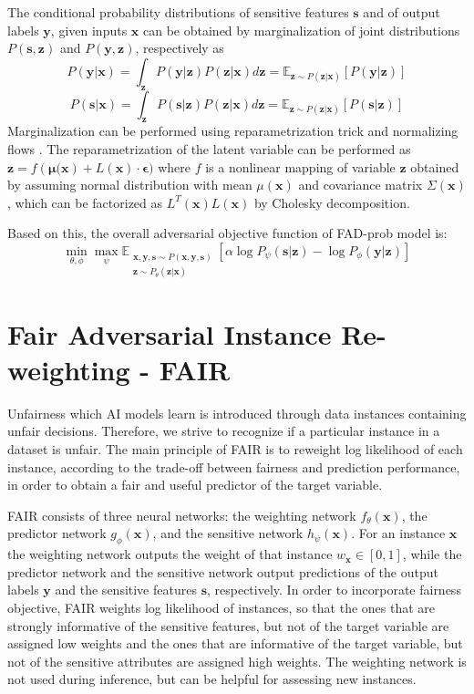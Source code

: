 \documentclass[preprint,12pt]{elsarticle}
\begin{document}
The conditional probability distributions of sensitive features $\mathbf{s}$ and of output labels $\mathbf{y}$,  given inputs $\mathbf{x}$ can be obtained by marginalization of joint distributions $P(\mathbf{s},\mathbf{z})$ and $P(\mathbf{y},\mathbf{z})$, respectively as
$$ P(\mathbf{y}|\mathbf{x}) = \int_\mathbf{z} P(\mathbf{y}|\mathbf{z}) P(\mathbf{z}|\mathbf{x}) d\mathbf{z} = \mathbb{E}_{\mathbf{z} \sim P(\mathbf{z}|\mathbf{x})} [P(\mathbf{y}|\mathbf{z})]$$
$$ P(\mathbf{s}|\mathbf{x}) = \int_\mathbf{z} P(\mathbf{s}|\mathbf{z}) P(\mathbf{z}|\mathbf{x}) d\mathbf{z} = \mathbb{E}_{\mathbf{z} \sim P(\mathbf{z}|\mathbf{x})} [P(\mathbf{s}|\mathbf{z})]$$
Marginalization can be performed using reparametrization trick and normalizing flows \cite{kingma2019introduction}. The reparametrization of the latent variable can be performed as $\mathbf{z} = f(\mathbf{\mu(\mathbf{x}})+ L(\mathbf{x})\cdot \mathbf{\epsilon})$
where $f$ is a nonlinear mapping of variable $\mathbf{z}$ obtained by assuming normal distribution with mean $\mu(\mathbf{x})$ and covariance matrix $\Sigma(\mathbf{x})$, which can be factorized as $L^T(\mathbf{x})L(\mathbf{x})$ by Cholesky decomposition.

Based on this, the overall adversarial objective function of FAD-prob model is:
$$\min_{\theta,\phi}\max_{\psi}\mathbb{E}_{\substack{\mathbf{x},\mathbf{y}, \mathbf{s} \sim P(\mathbf{x},\mathbf{y},\mathbf{s})\\\mathbf{z} \sim P_\theta(\mathbf{z}|\mathbf{x})}} \left[\alpha \log P_{\psi}(\mathbf{s}|\mathbf{z})  - \log P_{\phi}(\mathbf{y}|\mathbf{z})\right]$$


\section{Fair Adversarial Instance Re-weighting - FAIR}
\label{Sec:FAIR}
Unfairness which AI models learn is introduced through data instances containing unfair decisions. Therefore, we strive to recognize if a particular instance in a dataset is unfair. The main principle of FAIR is to reweight log likelihood of each instance, according to the trade-off between fairness and prediction performance, in order to obtain a fair and useful predictor of the target variable.

FAIR consists of three neural networks: the weighting network $f_\theta(\mathbf{x})$, the predictor network $g_\phi(\mathbf{x})$, and the sensitive network $h_\psi(\mathbf{x})$.
For an instance $\mathbf{x}$ the weighting network outputs the weight of that instance $w_\mathbf{x}\in[0,1]$, while the predictor network and the sensitive network output predictions of the output labels $\mathbf{y}$ and the sensitive features $\mathbf{s}$, respectively. In order to incorporate fairness objective, FAIR weights log likelihood of instances, so that the ones that are strongly informative of the sensitive features, but not of the target variable are assigned low weights and the ones that are informative of the target variable, but not of the sensitive attributes are assigned high weights.
The weighting network is not used during inference, but can be helpful for assessing new instances.
\end{document}
